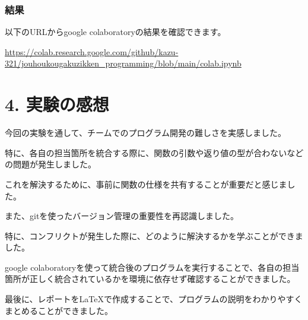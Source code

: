 \documentclass[a4paper,11pt]{jsarticle}
\begin{document}
\subsubsection*{結果}
以下のURLからgoogle colaboratoryの結果を確認できます。

\url{https://colab.research.google.com/github/kazu-321/jouhoukougakuzikken_programming/blob/main/colab.ipynb}

\section*{4. 実験の感想}
今回の実験を通して、チームでのプログラム開発の難しさを実感しました。

特に、各自の担当箇所を統合する際に、関数の引数や返り値の型が合わないなどの問題が発生しました。

これを解決するために、事前に関数の仕様を共有することが重要だと感じました。

また、gitを使ったバージョン管理の重要性を再認識しました。

特に、コンフリクトが発生した際に、どのように解決するかを学ぶことができました。

google colaboratoryを使って統合後のプログラムを実行することで、各自の担当箇所が正しく統合されているかを環境に依存せず確認することができました。

最後に、レポートを\LaTeX で作成することで、プログラムの説明をわかりやすくまとめることができました。
\end{document}

